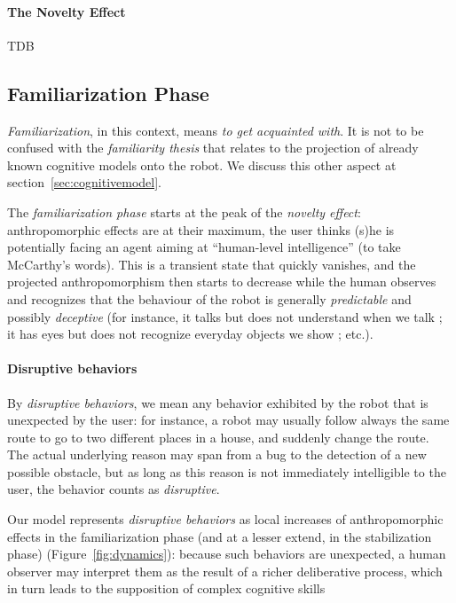 \documentclass{frontiersSCNS} %
\begin{document}
\paragraph{The Novelty Effect}
\label{sec:noveltyeffect}

TDB

\subsection*{Familiarization Phase}
\label{sec:familiarization}

\emph{Familiarization}, in this context, means \emph{to get acquainted with}.
It is not to be confused with the \emph{familiarity thesis} that relates to the
projection of already known cognitive models onto the robot. We discuss this other
aspect at section~\ref{sec:cognitivemodel}.

The \emph{familiarization phase} starts at the peak of the \emph{novelty
effect}: anthropomorphic effects are at their maximum, the user thinks (s)he is
potentially facing an agent aiming at ``human-level intelligence'' (to take
McCarthy's words). This is a transient state that quickly vanishes, and the
projected anthropomorphism then starts to decrease while the human observes and
recognizes that the behaviour of the robot is generally \emph{predictable} and
possibly \emph{deceptive} (for instance, it talks but does not understand when
we talk ; it has eyes but does not recognize everyday objects we show ; etc.).

\paragraph{Disruptive behaviors}

By \emph{disruptive behaviors}, we mean any behavior exhibited by the robot
that is unexpected by the user: for instance, a robot may usually follow always
the same route to go to two different places in a house, and suddenly change
the route. The actual underlying reason may span from a bug to the detection of
a new possible obstacle, but as long as this reason is not immediately
intelligible to the user, the behavior counts as \emph{disruptive}.

Our model represents \emph{disruptive behaviors} as local increases of
anthropomorphic effects in the familiarization phase (and at a lesser extend,
in the stabilization phase) (Figure~\ref{fig:dynamics}): because such behaviors
are unexpected, a human observer may interpret them as the result of a richer
deliberative process, which in turn leads to the supposition of complex
cognitive skills
\end{document}
